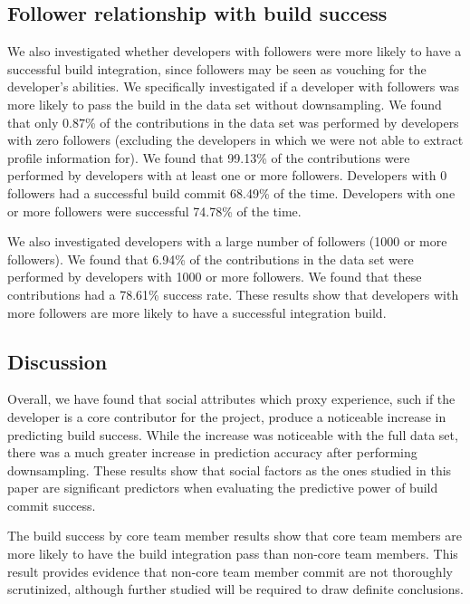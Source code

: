 \documentclass[10pt, conference]{IEEEtran}
\begin{document}
\subsection{Follower relationship with build success}
\label{sec:followerSuccess}

We also investigated whether developers with followers were more likely to have a
successful build integration, since followers may be seen as vouching for
the developer's abilities.  We specifically investigated if a developer with 
followers was more likely to pass the build in the data set without 
downsampling.  We found that only 0.87\% of the
contributions in the data set was performed by developers with zero 
followers (excluding the developers in which we were not able to extract profile
information for). We found that 99.13\% of the contributions were performed by
developers with at least one or more followers.
Developers with 0 followers had a successful build commit 68.49\%
of the time.  Developers with one or more followers were successful 74.78\% of
the time.

We also investigated developers with a large number of followers (1000 or more
followers).  We found that 6.94\% of the contributions in the data set were
performed by developers with 1000 or more followers.  We found that these
contributions had a 78.61\% success rate.  These results show that developers
with more followers are more likely to have a successful integration build.



\subsection{Discussion}

Overall, we have found that social attributes which proxy experience, such if
the developer is a core contributor for the project, produce a 
noticeable increase in predicting build success.  While the increase was noticeable 
with the full data set, there was a much greater increase in prediction
accuracy after performing downsampling. These results show that social factors
as the ones studied in this paper are significant predictors when
evaluating the predictive power of build commit success.

The build success by core team member results show that core team members are
more likely to have the build integration pass than non-core team members.  This
result provides evidence that non-core team member commit are not thoroughly
scrutinized, although further studied will be required to draw definite
conclusions.
\end{document}
